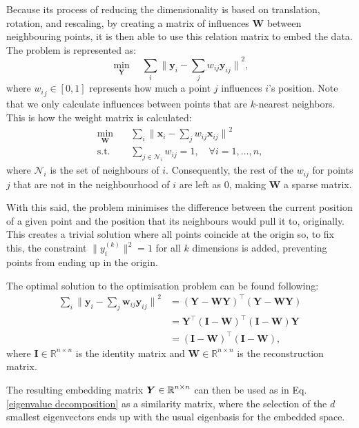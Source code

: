         Because its process of reducing the dimensionality is based on translation, rotation, and rescaling, by creating a matrix of influences $\bm{W}$ between neighbouring points, it is then able to use this relation matrix to embed the data. The problem is represented as:
        \begin{equation}
            \min_{\bm{Y}} \quad \sum_i {\| \bm{y}_i - \sum_j w_{ij} \bm{y}_{ij} \|}^2,
        \end{equation}
        where ${w_i}_j \in [0,1]$ represents how much a point $j$ influences $i$'s position. Note that we only calculate influences between points that are $k$-nearest neighbors. This is how the weight matrix is calculated:
        \begin{align}
            \min_{\bm{W}} \quad &
            \sum_i {\| \bm{x}_i - \sum_j w_{ij} \bm{x}_{ij} \|}^2 \\
            \textrm{s.t.} \quad 
                & \sum_{j\in\mathcal{N}_i} w_{ij} = 1,\quad\forall i=1,\dotsc,n,
            \label{eq:lle-weights}
        \end{align}
        where $\mathcal{N}_i$ is the set of neighbours of $i$. Consequently, the rest of the $w_{ij}$ for points $j$ that are not in the neighbourhood of $i$ are left as 0, making $\bm{W}$ a sparse matrix.
        
        With this said, the problem minimises the difference between the current position of a given point and the position that its neighbours would pull it to, originally. This creates a trivial solution where all points coincide at the origin so, to fix this, the constraint $ \| y_i^{(k)} \|^2 = 1$ for all $k$ dimensions is added, preventing points from ending up in the origin.
        
        The optimal solution to the optimisation problem can be found following:
        \begin{align}
            \sum_i {\| \bm{y}_i - \sum_j \bm{w}_{ij} \bm{y}_{ij} \|}^2
                &= (\bm{Y}- \bm{WY})^\top(\bm{Y}- \bm{WY}) \\
                &= \bm{Y}^\top (\bm{I} - \bm{W})^\top(\bm{I} - \bm{W}) \bm{Y} \\
                &= (\bm{I} - \bm{W})^\top(\bm{I} - \bm{W}),
        \end{align}
        where $\bm{I}\in\mathbb{R}^{n\times n}$ is the identity matrix and $\bm{W}\in\mathbb{R}^{n\times n}$ is the reconstruction matrix.
        
        The resulting embedding matrix $\boldsymbol{Y}\in\operatorname{\mathbb{R}}^{n\times n}$ can then be used as in Eq. \ref{eigenvalue decomposition} as a similarity matrix, where the selection of the $d$ smallest eigenvectors ends up with the usual eigenbasis for the embedded space.

